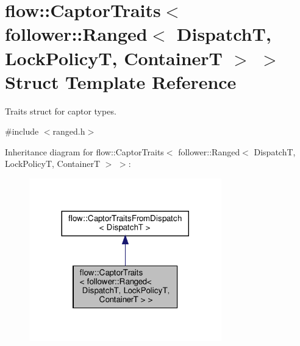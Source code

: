 \hypertarget{structflow_1_1_captor_traits_3_01follower_1_1_ranged_3_01_dispatch_t_00_01_lock_policy_t_00_01_container_t_01_4_01_4}{}\section{flow\+:\+:Captor\+Traits$<$ follower\+:\+:Ranged$<$ DispatchT, Lock\+PolicyT, ContainerT $>$ $>$ Struct Template Reference}
\label{structflow_1_1_captor_traits_3_01follower_1_1_ranged_3_01_dispatch_t_00_01_lock_policy_t_00_01_container_t_01_4_01_4}


Traits struct for captor types.  




{\ttfamily \#include $<$ranged.\+h$>$}



Inheritance diagram for flow\+:\+:Captor\+Traits$<$ follower\+:\+:Ranged$<$ DispatchT, Lock\+PolicyT, ContainerT $>$ $>$\+:
\nopagebreak
\begin{figure}[H]
\begin{center}
\leavevmode
\includegraphics[width=236pt]{structflow_1_1_captor_traits_3_01follower_1_1_ranged_3_01_dispatch_t_00_01_lock_policy_t_00_01_c617262bd8da7c1e39d912081ad438020}
\end{center}
\end{figure}


